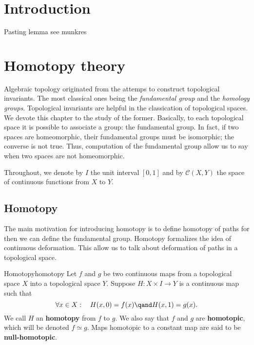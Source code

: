 \chapter{Introduction}


\begin{theorem}{Pasting lemma}{}
    see munkres
\end{theorem}

\chapter{Homotopy theory}




Algebraic topology originated from the attemps to construct topological invariants. The most classical ones being the \textit{fundamental group} and the \textit{homology groups}. Topological invariants are helpful in the classication of topological spaces. We  devote this chapter  to the study of the former. Basically,  to each topological space it is possible to associate a group: the fundamental group. In fact, if two spaces are homeomorphic, their fundamental groups must be isomorphic; the converse is not true. Thus, computation of the fundamental group allow us to say when two spaces are not homeomorphic. 

Throughout, we denote  by \(I\) the unit interval \([0,1]\) and by \(\mathcal{C}(X,Y)\) the space of continuous functions from \(X\) to \(Y\).


\section{Homotopy}

The main motivation for introducing homotopy is to define homotopy of paths for then we can define the fundamental group.
Homotopy formalizes the idea of continuous deformation. 
This allow us to talk about deformation of paths in a topological space.


\begin{definition}{Homotopy}{homotopy}
    Let \(f\) and \(g\) be two continuous maps from a topological space \(X\) into a topological space \(Y\). Suppose \(H \colon X\times I \to Y\) is a continuous map such that 
    \[
        \forall x\in X :\quad H(x,0) = f(x) \qand H(x,1) = g(x).
    \]
    We call \(H\) an \textbf{homotopy} from \(f\) to \(g\). We also say that \(f\) and \(g\) are \textbf{homotopic}, which will be denoted \(f\simeq g\). Maps homotopic to a constant map are said to be \textbf{null-homotopic}.
\end{definition}

